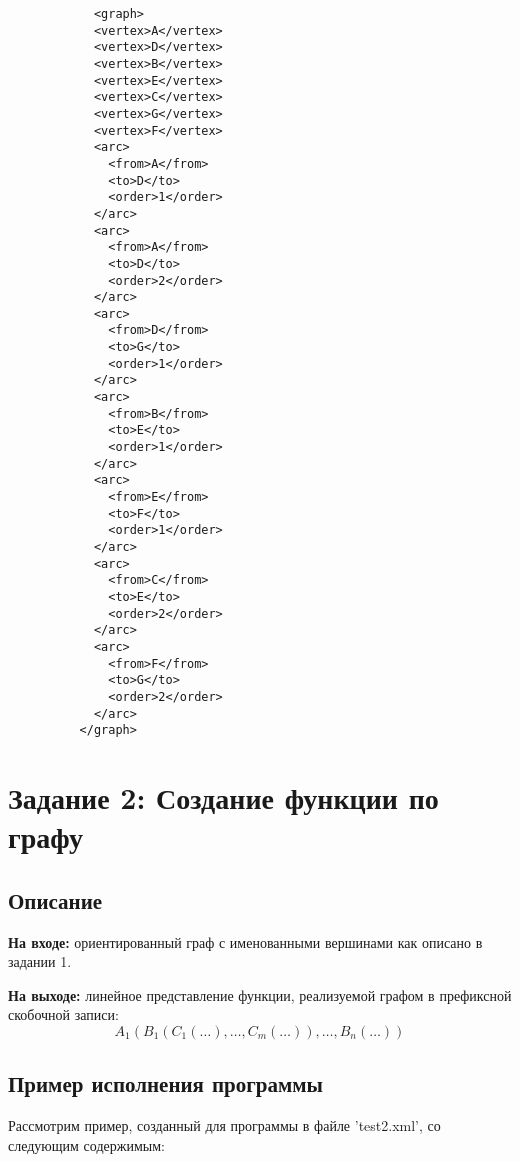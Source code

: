 \documentclass[bachelor, och, report]{../shiza}
\begin{document}
        \begin{verbatim}
            <graph>
            <vertex>A</vertex>
            <vertex>D</vertex>
            <vertex>B</vertex>
            <vertex>E</vertex>
            <vertex>C</vertex>
            <vertex>G</vertex>
            <vertex>F</vertex>
            <arc>
              <from>A</from>
              <to>D</to>
              <order>1</order>
            </arc>
            <arc>
              <from>A</from>
              <to>D</to>
              <order>2</order>
            </arc>
            <arc>
              <from>D</from>
              <to>G</to>
              <order>1</order>
            </arc>
            <arc>
              <from>B</from>
              <to>E</to>
              <order>1</order>
            </arc>
            <arc>
              <from>E</from>
              <to>F</to>
              <order>1</order>
            </arc>
            <arc>
              <from>C</from>
              <to>E</to>
              <order>2</order>
            </arc>
            <arc>
              <from>F</from>
              <to>G</to>
              <order>2</order>
            </arc>
          </graph>          
        \end{verbatim}

\section{Задание 2: Создание функции по графу}
    \subsection{Описание}

        \textbf{На входе:} ориентированный граф с именованными вершинами как
        описано в задании 1.

        \textbf{На выходе:} линейное представление функции, реализуемой графом в
        префиксной скобочной записи: $$A_1(B_1(C_1(\dots), \dots, C_m(\dots)),
        \dots, B_n(\dots))$$


    \subsection{Пример исполнения программы}

        Рассмотрим пример, созданный для программы в файле 'test2.xml', со
        следующим содержимым:
\end{document}
